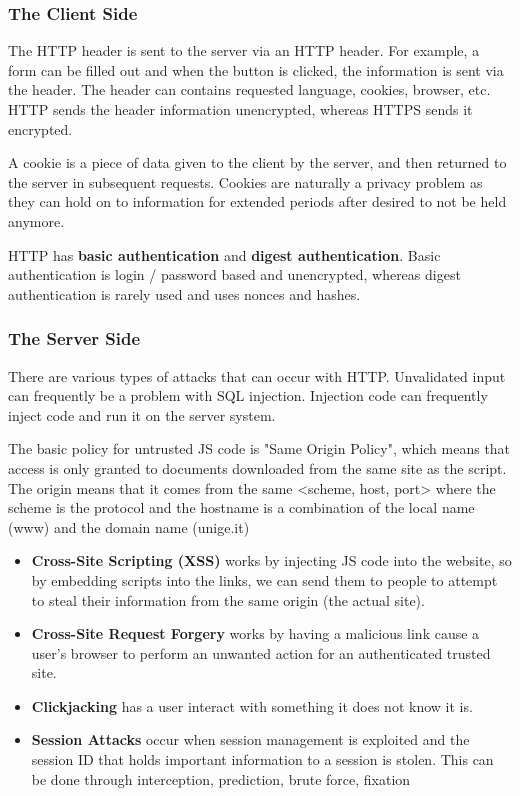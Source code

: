 \documentclass[11pt]{article}
\begin{document}
\subsubsection{The Client Side}
The HTTP header is sent to the server via an HTTP header.
For example, a form can be filled out and when the button is clicked, the information is sent via the header.
The header can contains requested language, cookies, browser, etc.
HTTP sends the header information unencrypted, whereas HTTPS sends it encrypted.

A cookie is a piece of data given to the client by the server, and then returned to the server in subsequent requests.
Cookies are naturally a privacy problem as they can hold on to information for extended periods after desired to not be held anymore.

HTTP has \textbf{basic authentication} and \textbf{digest authentication}.
Basic authentication is login / password based and unencrypted, whereas digest authentication is rarely used and uses nonces and hashes.

\subsubsection{The Server Side}
There are various types of attacks that can occur with HTTP.
Unvalidated input can frequently be a problem with SQL injection.
Injection code can frequently inject code and run it on the server system.

The basic policy for untrusted JS code is "Same Origin Policy", which means that access is only granted to documents downloaded from the same site as the script.
The origin means that it comes from the same <scheme, host, port> where the scheme is the protocol and the hostname is a combination of the local name (www) and the domain name (unige.it)

\begin{itemize}
    \item \textbf{Cross-Site Scripting (XSS)} works by injecting JS code into the website, so by embedding scripts into the links, we can send them to people to attempt to steal their information from the same origin (the actual site).
    \item \textbf{Cross-Site Request Forgery} works by having a malicious link cause a user's browser to perform an unwanted action for an authenticated trusted site.
    \item \textbf{Clickjacking} has a user interact with something it does not know it is.
    \item \textbf{Session Attacks} occur when session management is exploited and the session ID that holds important information to a session is stolen. 
          This can be done through interception, prediction, brute force, fixation
\end{itemize}
\end{document}
